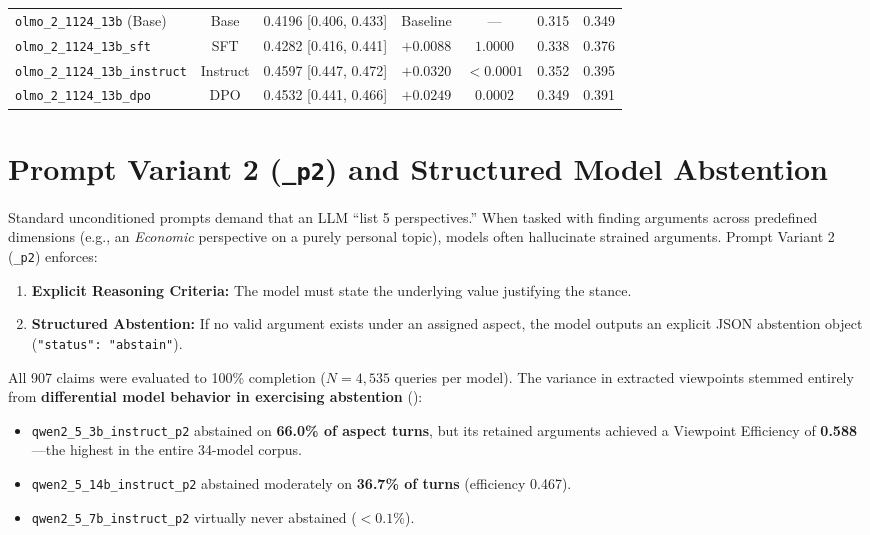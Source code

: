 \documentclass[11pt,a4paper]{article}
\begin{document}
\begin{table}[htbp]
\begin{adjustbox}{max width=\textwidth}
\begin{tabular}{l c c c c c c}
\texttt{olmo\_2\_1124\_13b} (Base) & Base & 0.4196 [0.406, 0.433] & Baseline & --- & 0.315 & 0.349 \\
\texttt{olmo\_2\_1124\_13b\_sft} & SFT & 0.4282 [0.416, 0.441] & $+0.0088$ & $1.0000$ & 0.338 & 0.376 \\
\texttt{olmo\_2\_1124\_13b\_instruct} & Instruct & 0.4597 [0.447, 0.472] & $+0.0320$ & $< 0.0001$ & 0.352 & 0.395 \\
\texttt{olmo\_2\_1124\_13b\_dpo} & DPO & 0.4532 [0.441, 0.466] & $+0.0249$ & $0.0002$ & 0.349 & 0.391 \\
\bottomrule
\end{tabular}
\end{adjustbox}
\end{table}

\section{Prompt Variant 2 (\texttt{\_p2}) and Structured Model Abstention}
\label{sec:prompt_p2}

Standard unconditioned prompts demand that an LLM ``list 5 perspectives.'' When tasked with finding arguments across predefined dimensions (e.g., an \textit{Economic} perspective on a purely personal topic), models often hallucinate strained arguments. Prompt Variant 2 (\texttt{\_p2}) enforces:
\begin{enumerate}[leftmargin=*,itemsep=1pt]
    \item \textbf{Explicit Reasoning Criteria:} The model must state the underlying value justifying the stance.
    \item \textbf{Structured Abstention:} If no valid argument exists under an assigned aspect, the model outputs an explicit JSON abstention object (\texttt{"status": "abstain"}).
\end{enumerate}

All 907 claims were evaluated to 100\% completion ($N = 4,535$ queries per model). The variance in extracted viewpoints stemmed entirely from \textbf{differential model behavior in exercising abstention} ():
\begin{itemize}[leftmargin=*,itemsep=1pt]
    \item \texttt{qwen2\_5\_3b\_instruct\_p2} abstained on \textbf{66.0\% of aspect turns}, but its retained arguments achieved a Viewpoint Efficiency of \textbf{0.588}---the highest in the entire 34-model corpus.
    \item \texttt{qwen2\_5\_14b\_instruct\_p2} abstained moderately on \textbf{36.7\% of turns} (efficiency 0.467).
    \item \texttt{qwen2\_5\_7b\_instruct\_p2} virtually never abstained ($<0.1\%$).
\end{itemize}
\end{document}
